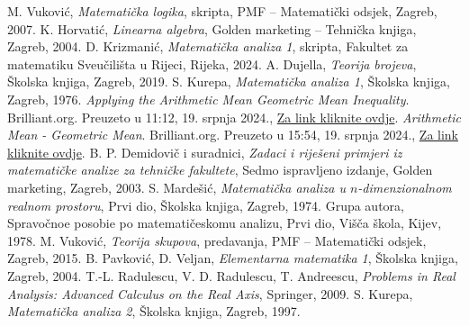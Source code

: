 \begin{thebibliography}{9}
M. Vuković, \textit{Matematička logika}, skripta, PMF -- Matematički odsjek, Zagreb, 2007.
K. Horvatić, \textit{Linearna algebra}, Golden marketing -- Tehnička knjiga, Zagreb, 2004.
D. Krizmanić, \textit{Matematička analiza 1}, skripta, Fakultet za matematiku Sveučilišta u Rijeci, Rijeka, 2024.
A. Dujella, \textit{Teorija brojeva}, Školska knjiga, Zagreb, 2019.
S. Kurepa, \textit{Matematička analiza 1}, Školska knjiga, Zagreb, 1976.
\textit{Applying the Arithmetic Mean Geometric Mean Inequality}. Brilliant.org. Preuzeto u 11:12, 19. srpnja 2024., \href{https://brilliant.org/wiki/applying-the-arithmetic-mean-geometric-mean/}{Za link kliknite ovdje}.
\textit{Arithmetic Mean - Geometric Mean}. Brilliant.org. Preuzeto u 15:54, 19. srpnja 2024., \href{https://brilliant.org/wiki/arithmetic-mean-geometric-mean/}{Za link kliknite ovdje}.
B. P. Demidovič i suradnici, \textit{Zadaci i riješeni primjeri iz matematičke analize za tehničke fakultete}, Sedmo ispravljeno izdanje, Golden marketing, Zagreb, 2003.
 S. Mardešić, \textit{Matematička analiza u $n$-dimenzionalnom realnom prostoru}, Prvi dio, Školska knjiga, Zagreb, 1974.
 Grupa autora, \foreignlanguage{russian}{Spravočnoe posobie po matematičeskomu analizu, Prvi dio, Višča škola, Kijev, 1978.}
 M. Vuković, \textit{Teorija skupova}, predavanja, PMF -- Matematički odsjek, Zagreb, 2015.
 B. Pavković, D. Veljan, \textit{Elementarna matematika 1}, Školska knjiga, Zagreb, 2004.
 T.-L. Radulescu, V. D. Radulescu, T. Andreescu, \textit{Problems in Real Analysis: Advanced Calculus on the Real Axis}, Springer, 2009.
 S. Kurepa, \textit{Matematička analiza 2}, Školska knjiga, Zagreb, 1997.
\end{thebibliography}